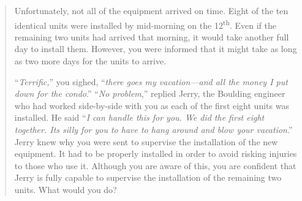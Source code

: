 \begin{enumerate}
\begin{quote}
Unfortunately, not all of the equipment arrived on time. Eight of the
ten identical units were installed by mid-morning on the
12\textsuperscript{th}. Even if the remaining two units had arrived that
morning, it would take another full day to install them. However, you
were informed that it might take as long as two more days for the units
to arrive.

``\emph{Terrific,}'' you sighed, ``\emph{there goes my vacation---and
all the money I put down for the condo}.'' ``\emph{No problem},''
replied Jerry, the Boulding engineer who had worked side-by-side with
you as each of the first eight units was installed. He said ``\emph{I
can handle this for you. We did the first eight together.
It\textquotesingle s silly for you to have to hang around and blow your
vacation}.'' Jerry knew why you were sent to supervise the installation
of the new equipment. It had to be properly installed in order to avoid
risking injuries to those who use it. Although you are aware of this,
you are confident that Jerry is fully capable to supervise the
installation of the remaining two units. What would you do?
\end{quote}

\end{enumerate}